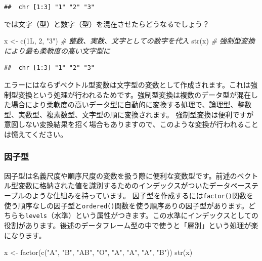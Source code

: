 \documentclass[
  12pt,
]{book}
\newenvironment{Shaded}{\begin{snugshade}}{\end{snugshade}}
\newcommand{\CommentTok}[1]{\textcolor[rgb]{0.56,0.35,0.01}{\textit{#1}}}
\newcommand{\DecValTok}[1]{\textcolor[rgb]{0.00,0.00,0.81}{#1}}
\newcommand{\FunctionTok}[1]{\textcolor[rgb]{0.00,0.00,0.00}{#1}}
\newcommand{\NormalTok}[1]{#1}
\newcommand{\OtherTok}[1]{\textcolor[rgb]{0.56,0.35,0.01}{#1}}
\newcommand{\StringTok}[1]{\textcolor[rgb]{0.31,0.60,0.02}{#1}}
\begin{document}
\begin{verbatim}
##  chr [1:3] "1" "2" "3"
\end{verbatim}

では文字（型）と数字（型）を混在させたらどうなるでしょう？

\begin{Shaded}
\begin{Highlighting}[]
\NormalTok{x }\OtherTok{\textless{}{-}} \FunctionTok{c}\NormalTok{(1L, }\DecValTok{2}\NormalTok{, }\StringTok{"3"}\NormalTok{)      }\CommentTok{\# 整数、実数、文字としての数字を代入}
\FunctionTok{str}\NormalTok{(x)                  }\CommentTok{\# 強制型変換により最も柔軟度の高い文字型に}
\end{Highlighting}
\end{Shaded}

\begin{verbatim}
##  chr [1:3] "1" "2" "3"
\end{verbatim}

エラーにはならずベクトル型変数は文字型の変数として作成されます。これは強制型変換という処理が行われるためです。強制型変換は複数のデータ型が混在した場合により柔軟度の高いデータ型に自動的に変換する処理で、論理型、整数型、実数型、複素数型、文字型の順に変換されます。 強制型変換は便利ですが意図しない変換結果を招く場合もありますので、このような変換が行われることは憶えてください。

\hypertarget{ux56e0ux5b50ux578b}{%
\subsubsection{因子型}\label{ux56e0ux5b50ux578b}}

因子型は名義尺度や順序尺度の変数を扱う際に便利な変数型です。前述のベクトル型変数に格納された値を識別するためのインデックスがついたデータベーステーブルのような仕組みを持っています。 因子型を作成するには\texttt{factor()}関数を使う順序なしの因子型と\texttt{ordered()}関数を使う順序ありの因子型があります。どちらも\texttt{levels}（水準）という属性がつきます。この水準にインデックスとしての役割があります。後述のデータフレーム型の中で使うと「層別」という処理が楽になります。

\begin{Shaded}
\begin{Highlighting}[]
\NormalTok{x }\OtherTok{\textless{}{-}} \FunctionTok{factor}\NormalTok{(}\FunctionTok{c}\NormalTok{(}\StringTok{"A"}\NormalTok{, }\StringTok{"B"}\NormalTok{, }\StringTok{"AB"}\NormalTok{, }\StringTok{"O"}\NormalTok{, }\StringTok{"A"}\NormalTok{, }\StringTok{"A"}\NormalTok{, }\StringTok{"A"}\NormalTok{, }\StringTok{"B"}\NormalTok{))}
\FunctionTok{str}\NormalTok{(x)}
\end{Highlighting}
\end{Shaded}
\end{document}
